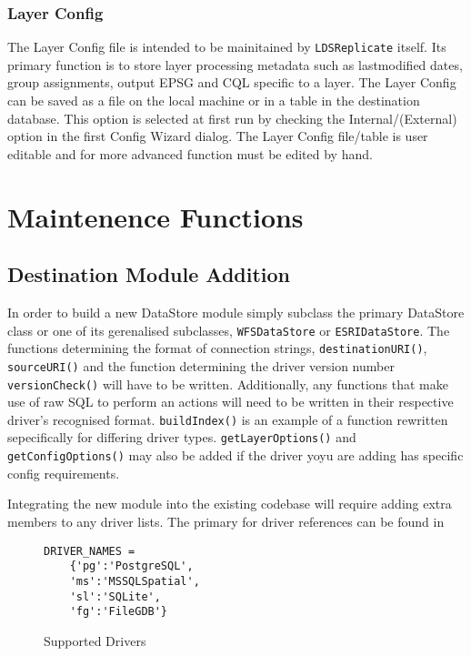 \documentclass[a4paper]{report}
\begin{document}
\subsubsection*{Layer Config}
The Layer Config file is intended to be mainitained by \lstinline|LDSReplicate|
itself. Its primary function is to store layer processing metadata such as lastmodified
dates, group assignments, output EPSG and CQL specific to a layer.
The Layer Config can be saved as a file on the local machine or in a table in
the destination database. This option is selected at first run by
checking the Internal/(External) option in the first Config Wizard dialog. The
Layer Config file/table is user editable and for more advanced function must be
edited by hand.


\section*{Maintenence Functions}

\subsection*{Destination Module Addition}
In order to build a new DataStore module simply subclass the primary DataStore
class or one of its gerenalised subclasses, \lstinline|WFSDataStore| or
\lstinline|ESRIDataStore|. The functions determining the format of connection
strings, \lstinline|destinationURI()|, \lstinline|sourceURI()| and the function
determining the driver version number \lstinline|versionCheck()| will have to be written. 
Additionally, any functions that make use of raw SQL
to perform an actions will need to be written in their respective driver's
recognised format. \lstinline|buildIndex()| is an example of a function
rewritten sepecifically for differing driver types.
\lstinline|getLayerOptions()| and \lstinline|getConfigOptions()| may also be
added if the driver yoyu are adding has specific config requirements.

Integrating the new module into the existing codebase will require adding extra
members to any driver lists. The primary for driver references can be found in 
\begin{figure}
\begin{lstlisting}
DRIVER_NAMES =
	{'pg':'PostgreSQL',
	'ms':'MSSQLSpatial',
	'sl':'SQLite',
	'fg':'FileGDB'}
\end{lstlisting}
\caption{Supported Drivers}
\label{fig:SupportedDrivers}
\end{figure}
\end{document}
